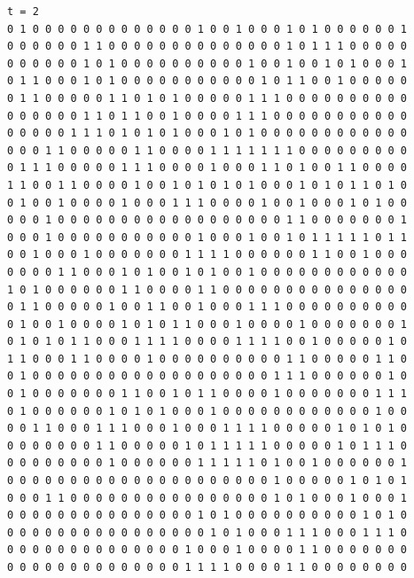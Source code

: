 \documentclass[a4paper,12pt]{article}
\begin{document}
\begin{verbatim}
t = 2
0 1 0 0 0 0 0 0 0 0 0 0 0 0 0 1 0 0 1 0 0 0 1 0 1 0 0 0 0 0 0 1 
0 0 0 0 0 0 1 1 0 0 0 0 0 0 0 0 0 0 0 0 0 0 1 0 1 1 1 0 0 0 0 0 
0 0 0 0 0 0 1 0 1 0 0 0 0 0 0 0 0 0 0 1 0 0 1 0 0 1 0 1 0 0 0 1 
0 1 1 0 0 0 1 0 1 0 0 0 0 0 0 0 0 0 0 0 1 0 1 1 0 0 1 0 0 0 0 0 
0 1 1 0 0 0 0 0 1 1 0 1 0 1 0 0 0 0 0 1 1 1 0 0 0 0 0 0 0 0 0 0 
0 0 0 0 0 0 1 1 0 1 1 0 0 1 0 0 0 0 1 1 1 0 0 0 0 0 0 0 0 0 0 0 
0 0 0 0 0 1 1 1 0 1 0 1 0 1 0 0 0 1 0 1 0 0 0 0 0 0 0 0 0 0 0 0 
0 0 0 1 1 0 0 0 0 0 1 1 0 0 0 0 1 1 1 1 1 1 1 0 0 0 0 0 0 0 0 0 
0 1 1 1 0 0 0 0 0 1 1 1 0 0 0 0 1 0 0 0 1 1 0 1 0 0 1 1 0 0 0 0 
1 1 0 0 1 1 0 0 0 0 1 0 0 1 0 1 0 1 0 1 0 0 0 1 0 1 0 1 1 0 1 0 
0 1 0 0 1 0 0 0 0 1 0 0 0 1 1 1 0 0 0 0 1 0 0 1 0 0 0 1 0 1 0 0 
0 0 0 1 0 0 0 0 0 0 0 0 0 0 0 0 0 0 0 0 0 0 1 1 0 0 0 0 0 0 0 1 
0 0 0 1 0 0 0 0 0 0 0 0 0 0 0 1 0 0 0 1 0 0 1 0 1 1 1 1 1 0 1 1 
0 0 1 0 0 0 1 0 0 0 0 0 0 0 1 1 1 1 0 0 0 0 0 0 1 1 0 0 1 0 0 0 
0 0 0 0 1 1 0 0 0 1 0 1 0 0 1 0 1 0 0 1 0 0 0 0 0 0 0 0 0 0 0 0 
1 0 1 0 0 0 0 0 0 1 1 0 0 0 0 1 1 0 0 0 0 0 0 0 0 0 0 0 0 0 0 0 
0 1 1 0 0 0 0 0 1 0 0 1 1 0 0 1 0 0 0 1 1 1 0 0 0 0 0 0 0 0 0 0 
0 1 0 0 1 0 0 0 0 1 0 1 0 1 1 0 0 0 1 0 0 0 0 1 0 0 0 0 0 0 0 1 
0 1 0 1 0 1 1 0 0 0 1 1 1 1 0 0 0 0 1 1 1 1 0 0 1 0 0 0 0 0 1 0 
1 1 0 0 0 1 1 0 0 0 0 1 0 0 0 0 0 0 0 0 0 0 1 1 0 0 0 0 0 1 1 0 
0 1 0 0 0 0 0 0 0 0 0 0 0 0 0 0 0 0 0 0 0 1 1 1 0 0 0 0 0 0 1 0 
0 1 0 0 0 0 0 0 0 1 1 0 0 1 0 1 1 0 0 0 0 1 0 0 0 0 0 0 0 1 1 1 
0 1 0 0 0 0 0 0 1 0 1 0 1 0 0 0 1 0 0 0 0 0 0 0 0 0 0 0 0 1 0 0 
0 0 1 1 0 0 0 1 1 1 0 0 0 1 0 0 0 1 1 1 1 0 0 0 0 0 1 0 1 0 1 0 
0 0 0 0 0 0 0 1 1 0 0 0 0 0 1 0 1 1 1 1 1 0 0 0 0 0 1 0 1 1 1 0 
0 0 0 0 0 0 0 0 1 0 0 0 0 0 0 1 1 1 1 1 0 1 0 0 1 0 0 0 0 0 0 1 
0 0 0 0 0 0 0 0 0 0 0 0 0 0 0 0 0 0 0 0 0 1 0 0 0 0 0 1 0 1 0 1 
0 0 0 1 1 0 0 0 0 0 0 0 0 0 0 0 0 0 0 0 0 1 0 1 0 0 0 1 0 0 0 1 
0 0 0 0 0 0 0 0 0 0 0 0 0 0 0 1 0 1 0 0 0 0 0 0 0 0 0 0 1 0 1 0 
0 0 0 0 0 0 0 0 0 0 0 0 0 0 0 0 1 0 1 0 0 0 1 1 1 0 0 0 1 1 1 0 
0 0 0 0 0 0 0 0 0 0 0 0 0 0 1 0 0 0 1 0 0 0 0 1 1 0 0 0 0 0 0 0 
0 0 0 0 0 0 0 0 0 0 0 0 0 0 1 1 1 1 0 0 0 0 1 1 0 0 0 0 0 0 0 0 




\end{verbatim}
\end{document}
